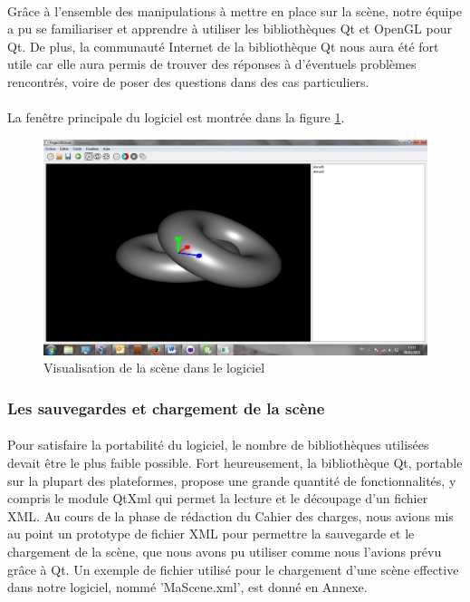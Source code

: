 \paragraph{}
Grâce à l'ensemble des manipulations à mettre en place sur la scène, notre équipe a pu se familiariser et apprendre à utiliser les bibliothèques Qt et OpenGL pour Qt. De plus, la communauté Internet de la bibliothèque Qt nous aura été fort utile car elle aura permis de trouver des réponses à d'éventuels problèmes rencontrés, voire de poser des questions dans des cas particuliers.

\paragraph{}
La fenêtre principale du logiciel est montrée dans la figure \ref{fig:screenScene}.

\begin{figure}[h]
	\centering
	\includegraphics[scale=0.3]{Scene.png}
	\caption{\label{fig:screenScene} Visualisation de la scène dans le logiciel \protect}
\end{figure}

\subsubsection{Les sauvegardes et chargement de la scène}
\paragraph{}
Pour satisfaire la portabilité du logiciel, le nombre de bibliothèques utilisées devait être le plus faible possible. Fort heureusement, la bibliothèque Qt, portable sur la plupart des plateformes, propose une grande quantité de fonctionnalités, y compris le module QtXml qui permet la lecture et le découpage d'un fichier XML. Au cours de la phase de rédaction du Cahier des charges, nous avions mis au point un prototype de fichier XML pour permettre la sauvegarde et le chargement de la scène, que nous avons pu utiliser comme nous l'avions prévu grâce à Qt. Un exemple de fichier utilisé pour le chargement d'une scène effective dans notre logiciel, nommé 'MaScene.xml', est donné en Annexe.

